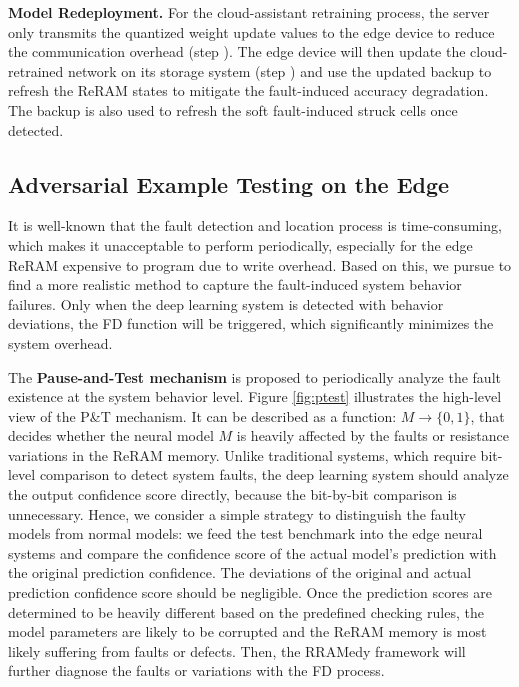                                                                                                                                 
\textbf{Model Redeployment.} For the cloud-assistant retraining process,  the server only transmits the quantized weight update values to the edge device to reduce the communication overhead (step ). The edge device will then update the cloud-retrained network on its storage system (step ) and use the updated backup to refresh the ReRAM states to mitigate the fault-induced accuracy degradation. The backup is also used to refresh the soft fault-induced struck cells once detected.
                                                                                                                                        
\subsection{Adversarial Example Testing on the Edge}
It is well-known that the fault detection and location process is time-consuming, which makes it unacceptable to perform periodically, especially for the edge ReRAM expensive to program due to write overhead. Based on this, we pursue to find a more realistic method to capture the fault-induced system behavior failures. Only when the deep learning system is detected with behavior deviations, the FD function will be triggered, which significantly minimizes the system overhead. 
    
The \textbf{Pause-and-Test mechanism} is proposed to periodically analyze the fault existence at the system behavior level. Figure \ref{fig:ptest} illustrates the high-level view of the P\&T mechanism. It can be described as a function: ${{M}} \to \{ 0,1\} $, that decides whether the neural model ${M}$ is heavily affected by the faults or resistance variations in the ReRAM memory. Unlike traditional systems, which require bit-level comparison to detect system faults, the deep learning system should analyze the output confidence score directly, because the bit-by-bit comparison is unnecessary. Hence, we consider a simple strategy to distinguish the faulty models from normal models: we feed the test benchmark into the edge neural systems and compare the confidence score of the actual model's prediction with the original prediction confidence. The deviations of the original and actual prediction confidence score should be negligible. Once the prediction scores are determined to be heavily different based on the predefined checking rules, the model parameters are likely to be corrupted and the ReRAM memory is most likely suffering from faults or defects. Then, the RRAMedy framework will further diagnose the faults or variations with the FD process.
                        
